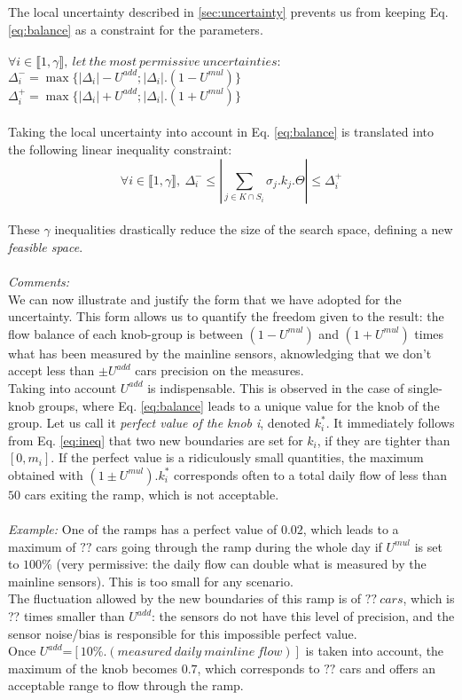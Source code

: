 The local uncertainty described in \ref{sec:uncertainty} prevents us from keeping Eq. \ref{eq:balance} as a constraint for the parameters.\\
\\
$\forall i \in {\llbracket 1,\gamma \rrbracket},\ let\ the\ most\ permissive\ uncertainties:$\\
$\Delta_{i}^{-}=\max{\{|\Delta_{i}|-U^{add};|\Delta_{i}|.(1-U^{mul})\}}$\\
$\Delta_{i}^{+}=\max{\{|\Delta_{i}|+U^{add};|\Delta_{i}|.(1+U^{mul})\}}$\\
\\
Taking the local uncertainty into account in Eq. \ref{eq:balance} is translated into the following linear inequality constraint:
\begin{equation}
\label{eq:ineq}
	\forall i\in \llbracket 1,\gamma \rrbracket,\ \Delta_{i}^{-}\leq |\sum\limits_{j\in K\cap S_{i}}\sigma_{j}.k_{j}.\Theta| \leq \Delta_{i}^{+}
\end{equation}
\\
These $\gamma$ inequalities drastically reduce the size of the search space, defining a new \emph{feasible space}.\\
\\
\emph{Comments:}\\
We can now illustrate and justify the form that we have adopted for the uncertainty. This form allows us to quantify the freedom given to the result: the flow balance of each knob-group is between $(1-U^{mul})$ and $(1+U^{mul})$ times what has been measured by the mainline sensors, aknowledging that we don't accept less than $\pm U^{add}$ cars precision on the measures.\\
Taking into account $U^{add}$ is indispensable. This is observed in the case of single-knob groups, where Eq. \ref{eq:balance} leads to a unique value for the knob of the group. Let us call it \emph{perfect value of the knob i}, denoted $k_{i}^{*}$. It immediately follows from Eq. \ref{eq:ineq} that two new boundaries are set for $k_{i}$, if they are tighter than $[0,m_{i}]$.  If the perfect value is a ridiculously small quantities, the maximum obtained with $(1\pm U^{mul}).k_{i}^{*}$ corresponds often to a total daily flow of less than $50$ cars exiting the ramp, which is not acceptable.\\ 
\\
\emph{Example:} One of the ramps has a perfect value of $0.02$, which leads to a maximum of $??$ cars going through the ramp during the whole day if $U^{mul}$ is set to $100\%$ (very permissive: the daily flow can double what is measured by the mainline sensors). This is too small for any scenario.\\ The fluctuation allowed by the new boundaries of this ramp is of $??\ cars$, which is ?? times smaller than $U^{add}$: the sensors do not have this level of precision, and the sensor noise/bias is responsible for this impossible perfect value. \\
Once $U^{add}$=$[10\%.(measured\ daily\ mainline\ flow)]$ is taken into account, the maximum of the knob becomes $0.7$, which corresponds to $??$ cars and offers an acceptable range to flow through the ramp.\\